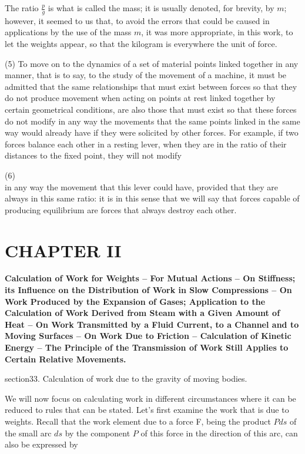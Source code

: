 \documentclass{book}
\begin{document}
The ratio \( \frac{p}{g} \) is what is called the mass; it is usually denoted, for brevity, by \( m \); however, it seemed to us that, to avoid the errors that could be caused in applications by the use of the mass \( m \), it was more appropriate, in this work, to let the weights appear, so that the kilogram is everywhere the unit of force.

(5) To move on to the dynamics of a set of material points linked together in any manner, that is to say, to the study of the movement of a machine, it must be admitted that the same relationships that must exist between forces so that they do not produce movement when acting on points at rest linked together by certain geometrical conditions, are also those that must exist so that these forces do not modify in any way the movements that the same points linked in the same way would already have if they were solicited by other forces. For example, if two forces balance each other in a resting lever, when they are in the ratio of their distances to the fixed point, they will not modify 



\newpage
(6)\\
in any way the movement that this lever could have, provided that they are always in this same ratio: it is in this sense that we will say that forces capable of producing equilibrium are forces that always destroy each other.


\chapter{CHAPTER II}

\textbf{Calculation of Work for Weights – For Mutual Actions – On Stiffness; its Influence on the Distribution of Work in Slow Compressions – On Work Produced by the Expansion of Gases; Application to the Calculation of Work Derived from Steam with a Given Amount of Heat – On Work Transmitted by a Fluid Current, to a Channel and to Moving Surfaces – On Work Due to Friction – Calculation of Kinetic Energy – The Principle of the Transmission of Work Still Applies to Certain Relative Movements.}

section{33. Calculation of work due to the gravity of moving bodies.}

We will now focus on calculating work in different circumstances where it can be reduced to rules that can be stated.
Let's first examine the work that is due to weights.
Recall that the work element due to a force F, being the product \(Pds\) of the small arc \(ds\) by the component \(P\) of this force in the direction of this arc, can also be expressed by 
\end{document}
